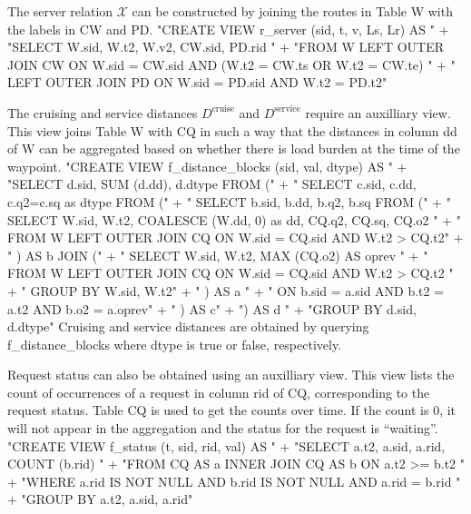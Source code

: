 The server relation $\mathcal{X}$ can be constructed by joining the routes in
Table W with the labels in CW and PD.
\nwenddocs{}\endmoddef{}
"CREATE VIEW r_server (sid, t, v, Ls, Lr) AS "
  + "SELECT W.sid, W.t2, W.v2, CW.sid, PD.rid "
  + "FROM W LEFT OUTER JOIN CW ON W.sid = CW.sid AND (W.t2 = CW.ts OR W.t2 = CW.te) "
  + "  LEFT OUTER JOIN PD ON W.sid = PD.sid AND W.t2 = PD.t2"
\nwendcode{}\nwdocspar

The cruising and service distances $D^\textrm{cruise}$ and $D^\textrm{service}$
require an auxilliary view. This view joins Table W with
CQ in such a way that the distances in column \textsf{dd} of W
can be aggregated based on whether there is load burden at the time of the
waypoint.
\nwenddocs{}\endmoddef{}
"CREATE VIEW f_distance_blocks (sid, val, dtype) AS "
  + "SELECT d.sid, SUM (d.dd), d.dtype FROM ("
  + "  SELECT c.sid, c.dd, c.q2=c.sq as dtype FROM ("
  + "    SELECT b.sid, b.dd, b.q2, b.sq FROM ("
  + "      SELECT W.sid, W.t2, COALESCE (W.dd, 0) as dd, CQ.q2, CQ.sq, CQ.o2 "
  + "      FROM W LEFT OUTER JOIN CQ ON W.sid = CQ.sid AND W.t2 > CQ.t2"
  + "    ) AS b JOIN ("
  + "      SELECT W.sid, W.t2, MAX (CQ.o2) AS oprev "
  + "      FROM W LEFT OUTER JOIN CQ ON W.sid = CQ.sid AND W.t2 > CQ.t2 "
  + "      GROUP BY W.sid, W.t2"
  + "    ) AS a "
  + "    ON b.sid = a.sid AND b.t2 = a.t2 AND b.o2 = a.oprev"
  + "  ) AS c"
  + ") AS d "
  + "GROUP BY d.sid, d.dtype"
\nwendcode{}Cruising and service distances are obtained by querying
f\_distance\_blocks where \textsf{dtype} is true or false, respectively.

Request status can also be obtained using an auxilliary view.  This view lists
the count of occurrences of a request in column \textsf{rid} of CQ,
corresponding to the request status.  Table CQ is used to get the counts over
time.  If the count is 0, it will not appear in the aggregation and the status
for the request is ``waiting''.
\nwenddocs{}\endmoddef{}
"CREATE VIEW f_status (t, sid, rid, val) AS "
  + "SELECT a.t2, a.sid, a.rid, COUNT (b.rid) "
  + "FROM CQ AS a INNER JOIN CQ AS b ON a.t2 >= b.t2 "
  + "WHERE a.rid IS NOT NULL AND b.rid IS NOT NULL AND a.rid = b.rid "
  + "GROUP BY a.t2, a.sid, a.rid"
\nwendcode{}\nwdocspar

